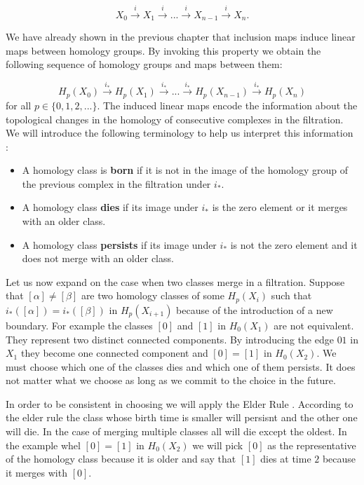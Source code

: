 $$ X_0 \overset{i}{\longrightarrow} X_1 \overset{i}{\longrightarrow} ... \overset{i}{\longrightarrow} X_{n-1} \overset{i}{\longrightarrow} X_n .$$

We have already shown in the previous chapter that inclusion maps induce linear maps between homology groups. By invoking this property we obtain the following sequence of homology groups and maps between them:

$$ H_p(X_0) \overset{i_*}{\longrightarrow} H_p(X_1) \overset{i_*}{\longrightarrow} ... \overset{i_*}{\longrightarrow} H_p(X_{n-1}) \overset{i_*}{\longrightarrow} H_p(X_n) $$
for all $p \in \{0, 1, 2, ...\}$. The induced linear maps encode the information about the topological changes in the homology of consecutive complexes in the filtration. We will introduce the following terminology to help us interpret this information \cite{elementary-applied-topology}:

\begin{itemize}
    \item A homology class is \textbf{born} if it is not in the image of the homology group of the previous complex in the filtration under $i_*$.
    \item A homology class \textbf{dies} if its image under $i_*$ is the zero element or it merges with an older class.
    \item A homology class \textbf{persists} if its image under $i_*$ is not the zero element and it does not merge with an older class.
\end{itemize}

Let us now expand on the case when two classes merge in a filtration. Suppose that $[\alpha] \ne [\beta]$ are two homology classes of some $H_p(X_i)$ such that $i_*([\alpha]) = i_*([\beta])$ in $H_p(X_{i+1})$ because of the introduction of a new boundary. For example the classes $[0]$ and $[1]$ in $H_0(X_1)$ are not equivalent. They represent two distinct connected components. By introducing the edge $01$ in $X_1$ they become one connected component and $[0] = [1]$ in $H_0(X_2)$. We must choose which one of the classes dies and which one of them persists. It does not matter what we choose as long as we commit to the choice in the future.

In order to be consistent in choosing we will apply the Elder Rule \cite[p.~150]{comp-topo}. According to the elder rule the class whose birth time is smaller will persisnt and the other one will die. In the case of merging multiple classes all will die except the oldest. In the example whel $[0] = [1]$ in $H_0(X_2)$ we will pick $[0]$ as the representative of the homology class because it is older and say that $[1]$ dies at time $2$ because it merges with $[0]$.

